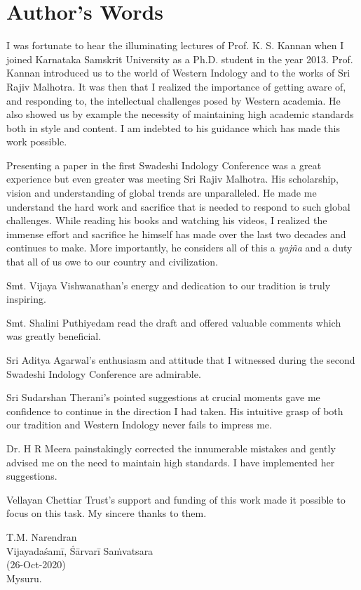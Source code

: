 
\chapter*{Author’s Words}\label{authorswords}

I was fortunate to hear the illuminating lectures of Prof. K. S. Kannan when I joined Karnataka Samskrit University as a Ph.D. student in the year 2013. Prof. Kannan introduced us to the world of Western Indology and to the works of Sri Rajiv Malhotra. It was then that I realized the importance of getting aware of, and responding to, the intellectual challenges posed by Western academia. He also showed us by example the necessity of maintaining high academic standards both in style and content. I am indebted to his guidance which has made this work possible.

Presenting a paper in the first Swadeshi Indology Conference was a great experience but even greater was meeting Sri Rajiv Malhotra. His scholarship, vision and understanding of global trends are unparalleled. He made me understand the hard work and sacrifice that is needed to respond to such global challenges. While reading his books and watching his videos, I realized the immense effort and sacrifice he himself has made over the last two decades and continues to make. More importantly, he considers all of this a \textit{yajña} and a duty that all of us owe to our country and civilization.

Smt. Vijaya Vishwanathan’s energy and dedication to our tradition is truly inspiring.

Smt. Shalini Puthiyedam read the draft and offered valuable comments which was greatly beneficial.

Sri Aditya Agarwal’s enthusiasm and attitude that I witnessed during the second Swadeshi Indology Conference are admirable.

Sri Sudarshan Therani’s pointed suggestions at crucial moments gave me confidence to continue in the direction I had taken. His intuitive grasp of both our tradition and Western Indology never fails to impress me.

Dr. H R Meera painstakingly corrected the innumerable mistakes and gently advised me on the need to maintain high standards. I have implemented her suggestions.

Vellayan Chettiar Trust’s support and funding of this work made it possible to focus on this task. My sincere thanks to them.

\begin{flushright}
T.M. Narendran\\ Vijayadaśamī, Śārvarī Saṁvatsara\\(26-Oct-2020)\\ Mysuru.
\end{flushright}

